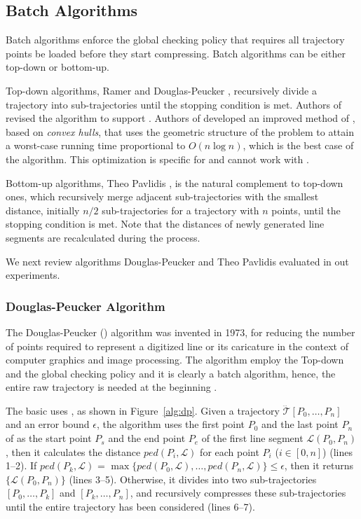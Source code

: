 \subsection{Batch Algorithms}

Batch algorithms enforce the global checking policy that requires all trajectory points be loaded before they start compressing. %
Batch algorithms can be either top-down or bottom-up.

Top-down algorithms, \eg Ramer \cite{Ramer:Split} and Douglas-Peucker \cite{Douglas:Peucker}, recursively divide a trajectory into sub-trajectories until the stopping condition is met.
Authors of \cite{Meratnia:Spatiotemporal} revised the \dpa algorithm to support \sed.
Authors of \cite{Hershberger:Speeding} developed an improved method of \dpa, based on \emph{convex hulls}, that uses the geometric structure of the problem to attain a worst-case running time proportional to $O(n\log n)$, which is the best case of the \dpa algorithm. {This optimization is specific for \ped and cannot work with \sed.}

Bottom-up algorithms, \eg Theo Pavlidis \cite{Pavlidis:Segment}, is the natural complement to top-down ones, which recursively merge adjacent sub-trajectories with the smallest distance, initially $n/2$  sub-trajectories for a trajectory with $n$ points, until the stopping condition is met. Note that the distances of newly generated line segments are recalculated during the process.

We next review algorithms Douglas-Peucker and Theo Pavlidis evaluated in out experiments.
\subsubsection{Douglas-Peucker Algorithm}

The Douglas-Peucker (\dpa) algorithm \cite{Douglas:Peucker} was invented in 1973, for reducing the number of points required to represent a digitized line or its caricature in the context of computer graphics and image processing.
The \dpa algorithm employ the Top-down and the global checking policy and it is clearly a batch algorithm, hence, the entire raw trajectory is needed at the beginning \cite{Meratnia:Spatiotemporal}.

The basic \dpa uses \ped, as shown in Figure~\ref{alg:dp}.
Given a trajectory $\dddot{\mathcal{T}}[P_0, \ldots, P_n]$ and an error bound $\epsilon$, the algorithm uses the first point $P_0$ and the last point $P_n$ of  as the start point $P_s$ and the end point $P_e$ of the first line segment $\mathcal{L}(P_0, P_n)$, then it calculates the distance $ped(P_i, {\mathcal{L}})$ for each point $P_i$ ($i\in[0,n]$) (lines 1--2). If $ped(P_k, {\mathcal{L}})$ = $\max \{ped(P_0, {\mathcal{L}}), \ldots, ped(P_n, {\mathcal{L}}) \} \le \epsilon$, then it returns $\{\mathcal{L}(P_0,P_n)\}$ (lines 3--5). Otherwise, it divides  into two sub-trajectories $[P_0, \ldots, P_k]$ and $[P_{k}, \ldots, P_n]$, and recursively compresses these sub-trajectories until the entire trajectory has been considered (lines 6--7).

